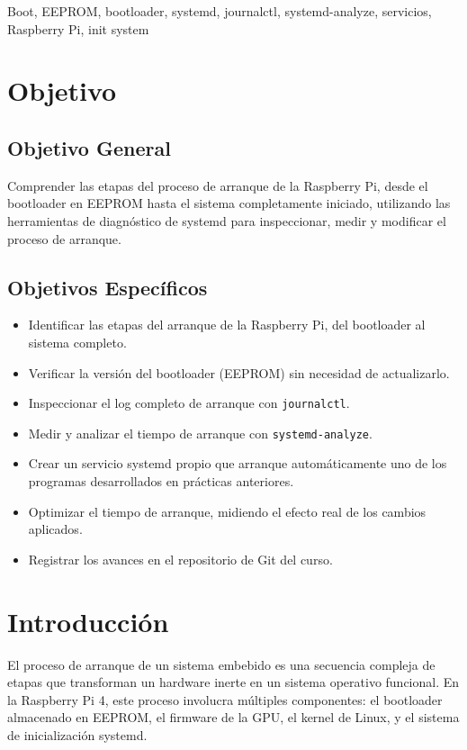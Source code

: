 \documentclass[conference]{IEEEtran}
\begin{document}
\begin{IEEEkeywords}
	Boot, EEPROM, bootloader, systemd, journalctl, systemd-analyze, servicios, Raspberry Pi, init system
\end{IEEEkeywords}

\section{Objetivo}

\subsection{Objetivo General}
Comprender las etapas del proceso de arranque de la Raspberry Pi, desde el bootloader en EEPROM hasta el sistema completamente iniciado, utilizando las herramientas de diagnóstico de systemd para inspeccionar, medir y modificar el proceso de arranque.

\subsection{Objetivos Específicos}
\begin{itemize}
	\item Identificar las etapas del arranque de la Raspberry Pi, del bootloader al sistema completo.
	\item Verificar la versión del bootloader (EEPROM) sin necesidad de actualizarlo.
	\item Inspeccionar el log completo de arranque con \texttt{journalctl}.
	\item Medir y analizar el tiempo de arranque con \texttt{systemd-analyze}.
	\item Crear un servicio systemd propio que arranque automáticamente uno de los programas desarrollados en prácticas anteriores.
	\item Optimizar el tiempo de arranque, midiendo el efecto real de los cambios aplicados.
	\item Registrar los avances en el repositorio de Git del curso.
\end{itemize}

\section{Introducción}

El proceso de arranque de un sistema embebido es una secuencia compleja de etapas que transforman un hardware inerte en un sistema operativo funcional. En la Raspberry Pi 4, este proceso involucra múltiples componentes: el bootloader almacenado en EEPROM, el firmware de la GPU, el kernel de Linux, y el sistema de inicialización systemd.
\end{document}
